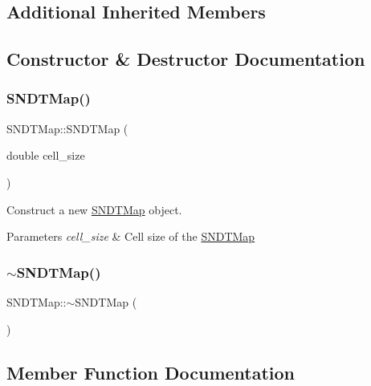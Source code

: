\subsection*{Additional Inherited Members}


\subsection{Constructor \& Destructor Documentation}
\mbox{\label{classSNDTMap_a813681a71844eb9e8df6bb0a267f5e99}} 
\subsubsection{\texorpdfstring{S\+N\+D\+T\+Map()}{SNDTMap()}}
{\footnotesize\ttfamily S\+N\+D\+T\+Map\+::\+S\+N\+D\+T\+Map (\begin{DoxyParamCaption}\item[{double}]{cell\+\_\+size }\end{DoxyParamCaption})\hspace{0.3cm}{\ttfamily [explicit]}}



Construct a new \hyperlink{classSNDTMap}{S\+N\+D\+T\+Map} object. 


\begin{DoxyParams}{Parameters}
{\em cell\+\_\+size} & Cell size of the \hyperlink{classSNDTMap}{S\+N\+D\+T\+Map} \\
\hline
\end{DoxyParams}
\mbox{\label{classSNDTMap_a84f70ba8ebdf71b84700bb3352f3bf4c}} 
\subsubsection{\texorpdfstring{$\sim$\+S\+N\+D\+T\+Map()}{~SNDTMap()}}
{\footnotesize\ttfamily S\+N\+D\+T\+Map\+::$\sim$\+S\+N\+D\+T\+Map (\begin{DoxyParamCaption}{ }\end{DoxyParamCaption})}



\subsection{Member Function Documentation}
\mbox{\label{classSNDTMap_a2514d18c921a37d25a43adce58f19bfd}} 
